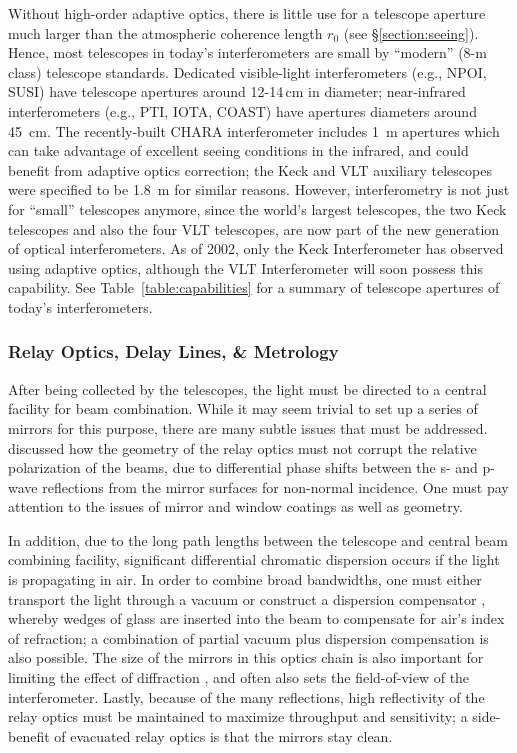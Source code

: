 \documentclass[12pt]{article}
\begin{document}
Without high-order adaptive optics, there is little use for a
telescope aperture much larger than the atmospheric coherence length
$r_0$ (see \S\ref{section:seeing}). Hence, most telescopes in today's
interferometers are small by ``modern'' (8-m class) telescope
standards.  Dedicated visible-light interferometers (e.g., NPOI, SUSI)
have telescope apertures around 12-14\,cm in diameter; near-infrared
interferometers (e.g., PTI, IOTA, COAST) have apertures diameters
around 45~cm.  The recently-built CHARA interferometer includes 1~m
apertures which can take advantage of excellent seeing conditions in
the infrared, and could benefit from adaptive optics correction; the
Keck and VLT auxiliary telescopes were specified to be 1.8~m for
similar reasons.  However, interferometry is not just for ``small''
telescopes anymore, since the world's largest telescopes, the two Keck
telescopes and also the four VLT telescopes, are now part of the new
generation of optical interferometers.  As of 2002, only the Keck
Interferometer has observed using adaptive optics, although the VLT
Interferometer will soon possess this capability.  See
Table~\ref{table:capabilities} for a summary of telescope apertures of
today's interferometers.

\subsubsection{Relay Optics, Delay Lines, \& Metrology}
\label{relay}

After being collected by the telescopes, the light must be directed to
a central facility for beam combination.  While it may seem trivial to
set up a series of mirrors for this purpose, there are many subtle
issues that must be addressed.  \citet{traub1988} discussed how the
geometry of the relay optics must not corrupt the relative
polarization of the beams, due to differential phase shifts between
the s- and p-wave reflections from the mirror surfaces for non-normal
incidence.  One must pay attention to the issues of mirror and
window coatings as well as geometry.

In addition, due to the long path lengths between the telescope and
central beam combining facility, significant differential chromatic 
dispersion
occurs if the light is propagating in air.  In order to combine broad
bandwidths, one must either transport the light through a vacuum or
construct a dispersion compensator \citep{tango1990,theo1995}, whereby
wedges of glass are inserted into the beam to compensate for air's
index of refraction; a combination of partial vacuum plus dispersion
compensation is also possible.  The size of the mirrors in this optics
chain is also important for limiting the effect of diffraction
\citep{horton2001}, and often also sets the field-of-view of the
interferometer.  Lastly, because of the many reflections, high
reflectivity of the relay optics must be maintained to maximize
throughput and sensitivity; a side-benefit of evacuated relay optics
is that the mirrors stay clean.
\end{document}
